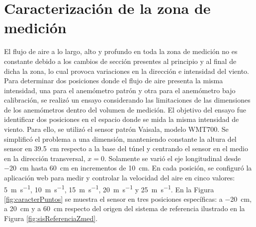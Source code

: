 \section{Caracterización de la zona de medición}\label{sec:caracterZonaMed}
El flujo de aire a lo largo, alto y profundo en toda la zona de medición no es constante debido a los cambios de sección presentes al principio y al final de dicha la zona, lo cual provoca variaciones en la dirección e  intensidad del viento. Para determinar dos posiciones donde el flujo de aire presenta la misma intensidad, una para el anemómetro patrón y otra para el anemómetro bajo calibración, se realizó un ensayo considerando las limitaciones de las dimensiones de los anemómetros dentro del volumen de medición. El objetivo del ensayo fue identificar dos posiciones en el espacio donde se mida la misma intensidad de viento. Para ello, se utilizó el sensor patrón Vaisala, modelo WMT700. Se simplificó el problema a una dimensión, manteniendo constante la altura del sensor en \SI{39.5}{\centi\meter} respecto a la base del túnel y centrando el sensor en el medio en la dirección transversal, $x=0$. Solamente se varió el eje longitudinal desde \SI{-20}{\centi\meter} hasta \SI{60}{\centi\meter} en incrementos de \SI{10}{\centi\meter}. En cada posición, se configuró la aplicación web para medir y controlar la velocidad del aire en cinco valores: \SI{5}{\meter\per\second}, \SI{10}{\meter\per\second}, \SI{15}{\meter\per\second}, \SI{20}{\meter\per\second} y \SI{25}{\meter\per\second}. En la Figura \ref{fig:caracterPuntos} se muestra el sensor en tres posiciones específicas: a \SI{-20}{\centi\meter}, a \SI{20}{\centi\meter} y a \SI{60}{\centi\meter} respecto del origen del sistema de referencia ilustrado en la Figura \ref{fig:sisReferenciaZmed}.

